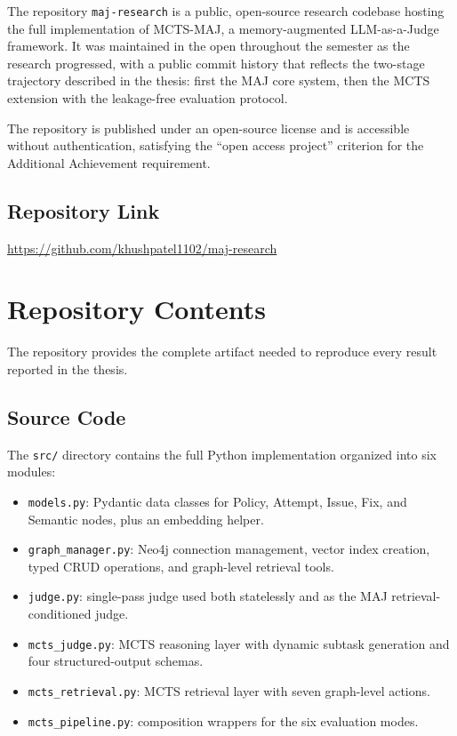 \documentclass[12pt,a4paper]{article}
\begin{document}
The repository \texttt{maj-research} is a public, open-source research codebase hosting the full implementation of MCTS-MAJ, a memory-augmented LLM-as-a-Judge framework. It was maintained in the open throughout the semester as the research progressed, with a public commit history that reflects the two-stage trajectory described in the thesis: first the MAJ core system, then the MCTS extension with the leakage-free evaluation protocol.

The repository is published under an open-source license and is accessible without authentication, satisfying the ``open access project'' criterion for the Additional Achievement requirement.

\subsection{Repository Link}

\url{https://github.com/khushpatel1102/maj-research}

\section{Repository Contents}

The repository provides the complete artifact needed to reproduce every result reported in the thesis.

\subsection{Source Code}

The \texttt{src/} directory contains the full Python implementation organized into six modules:

\begin{itemize}
    \item \texttt{models.py}: Pydantic data classes for Policy, Attempt, Issue, Fix, and Semantic nodes, plus an embedding helper.
    \item \texttt{graph\_manager.py}: Neo4j connection management, vector index creation, typed CRUD operations, and graph-level retrieval tools.
    \item \texttt{judge.py}: single-pass judge used both statelessly and as the MAJ retrieval-conditioned judge.
    \item \texttt{mcts\_judge.py}: MCTS reasoning layer with dynamic subtask generation and four structured-output schemas.
    \item \texttt{mcts\_retrieval.py}: MCTS retrieval layer with seven graph-level actions.
    \item \texttt{mcts\_pipeline.py}: composition wrappers for the six evaluation modes.
\end{itemize}
\end{document}
